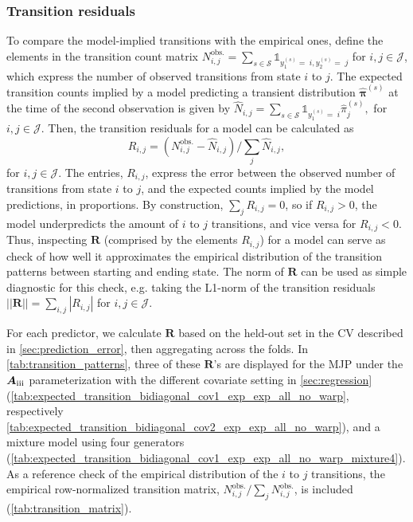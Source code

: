 \documentclass{article}
\newcommand{\RN}[1]{\textup{\uppercase\expandafter{\romannumeral#1}}}
\begin{document}
\subsubsection{Transition residuals} \label{sec:transition_patterns}

To compare the model-implied transitions with the empirical ones, define the elements in the transition count matrix
$
  N_{i,j}^{\text{obs.}} = \sum_{s \in \mathcal S} \mathds{1}_{y_1^{(s)} =\; i, y_2^{(s)} =\; j}
$ for $i,j \in \mathcal J$, which express the number of observed transitions from state $i$ to $j$. The expected transition counts implied by a model predicting a transient distribution $\widehat{\bm \pi}^{(s)}$ at the time of the second observation is given by
$
\widehat{  N}_{i,j} =  \sum_{s \in \mathcal S} \mathds{1}_{y_1^{(s)} = \; i} \widehat{ \pi}_j^{(s)},
$ for $i,j \in \mathcal J$.
Then, the transition residuals for a model can be calculated as
$$
  R_{i,j} = \left(  N_{i,j}^{\text{obs.}} - \widehat{  N}_{i,j} \right) / \sum_{j}   \widehat{  N}_{i,j},
$$ for $i,j \in \mathcal J$.
The entries, $  R_{i,j}$, express the error between the observed number of transitions from state $i$ to $j$, and the expected counts implied by the model predictions, in proportions. 
By construction, $\sum_{j}   R_{i,j} = 0$, so if $  R_{i,j} > 0$, the model underpredicts the amount of $i$ to $j$ transitions, and vice versa for $  R_{i,j} < 0$.
Thus, inspecting $\bm R$ (comprised by the elements $R_{i,j}$) for a model can serve as check of how well it approximates the empirical distribution of the transition patterns between starting and ending state. The norm of $\bm R$ can be used as simple diagnostic for this check, e.g. taking the L1-norm of the transition residuals
$
|| \bm R || = \sum_{i,j} |  R_{i,j}|
$ for $i,j \in \mathcal J$.

For each predictor, we calculate $\bm R$ based on the held-out set in the CV described in \cref{sec:prediction_error}, then aggregating across the folds. In \cref{tab:transition_patterns}, three of these $\bm R$'s are displayed for the MJP under the $\bm{A}_{\RN{3}}$ parameterization with the different covariate setting in \cref{sec:regression} (\cref{tab:expected_transition_bidiagonal_cov1_exp_exp_all_no_warp}, respectively \cref{tab:expected_transition_bidiagonal_cov2_exp_exp_all_no_warp}), and a mixture model using four generators (\cref{tab:expected_transition_bidiagonal_cov1_exp_exp_all_no_warp_mixture4}). As a reference check of the empirical distribution of the $i$ to $j$ transitions, the empirical row-normalized transition matrix, $ N_{i,j}^{\text{obs.}} / \sum_{j}  N_{i,j}^{\text{obs.}}$, is included (\cref{tab:transition_matrix}).
\end{document}
